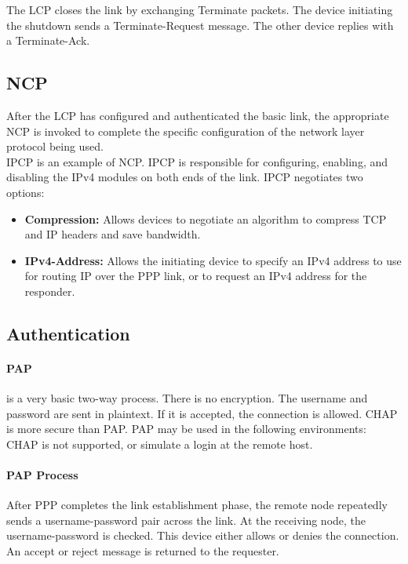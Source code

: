 The LCP closes the link by exchanging Terminate packets. The device initiating the shutdown sends a Terminate-Request message. The other device replies with a Terminate-Ack. 

\subsection{NCP}

After the LCP has configured and authenticated the basic link, the appropriate NCP is invoked to complete the specific configuration of the network layer protocol being used.\\

IPCP is an example of NCP. IPCP is responsible for configuring, enabling, and disabling the IPv4 modules on both ends of the link. IPCP negotiates two options:

\begin{itemize}
\item \textbf{Compression:} Allows devices to negotiate an algorithm to compress TCP and IP headers and save bandwidth.

\item \textbf{IPv4-Address:} Allows the initiating device to specify an IPv4 address to use for routing IP over the PPP link, or to request an IPv4 address for the responder.
\end{itemize}

\subsection{Authentication}

\paragraph{PAP}is a very basic two-way process. There is no encryption. The username and password are sent in plaintext. If it is accepted, the connection is allowed. CHAP is more secure than PAP. PAP may be used in the following environments: CHAP is not supported, or simulate a login at the remote host. \\

\paragraph{PAP Process}After PPP completes the link establishment phase, the remote node repeatedly sends a username-password pair across the link. At the receiving node, the username-password is checked. This device either allows or denies the connection. An accept or reject message is returned to the requester.

